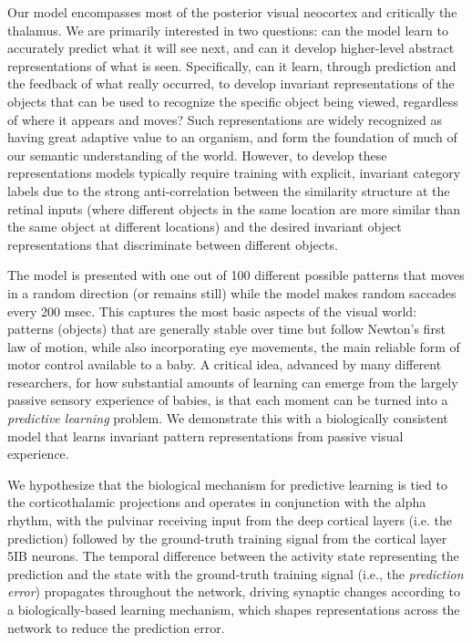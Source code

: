 \documentclass[11pt,twoside]{article}
\newif\myifpdf
\begin{document}
Our model encompasses most of the posterior visual neocortex and critically the thalamus. We are primarily interested in two questions: can the model learn to accurately predict what it will see next, and can it develop higher-level abstract representations of what is seen. Specifically, can it learn, through prediction and the feedback of what really occurred, to develop invariant representations of the objects that can be used to recognize the specific object being viewed, regardless of where it appears and moves?  Such representations are widely recognized as having great adaptive value to an organism, and form the foundation of much of our semantic understanding of the world.  However, to develop these representations models typically require training with explicit, invariant category labels due to the strong anti-correlation between the similarity structure at the retinal inputs (where different objects in the same location are more similar than the same object at different locations) and the desired invariant object representations that discriminate between different objects.

The model is presented with one out of 100 different possible patterns that moves in a random direction (or remains still) while the model makes random saccades every 200 msec. This captures the most basic aspects of the visual world: patterns (objects) that are generally stable over time but follow Newton's first law of motion, while also incorporating eye movements, the main reliable form of motor control available to a baby. A critical idea, advanced by many different researchers, for how substantial amounts of learning can emerge from the largely passive sensory experience of babies, is that each moment can be turned into a {\em predictive learning} problem. We demonstrate this with a biologically consistent model that learns invariant pattern representations from passive visual experience. 

We hypothesize that the biological mechanism for predictive learning is tied to the corticothalamic projections and operates in conjunction with the alpha rhythm, with the pulvinar receiving input from the deep cortical layers (i.e. the prediction) followed by the ground-truth training signal from the cortical layer 5IB neurons. The temporal difference between the activity state representing the prediction and the state with the ground-truth training signal (i.e., the {\em prediction error}) propagates throughout the network, driving synaptic changes according to a biologically-based learning mechanism, which shapes representations across the network to reduce the prediction error.
\end{document}
